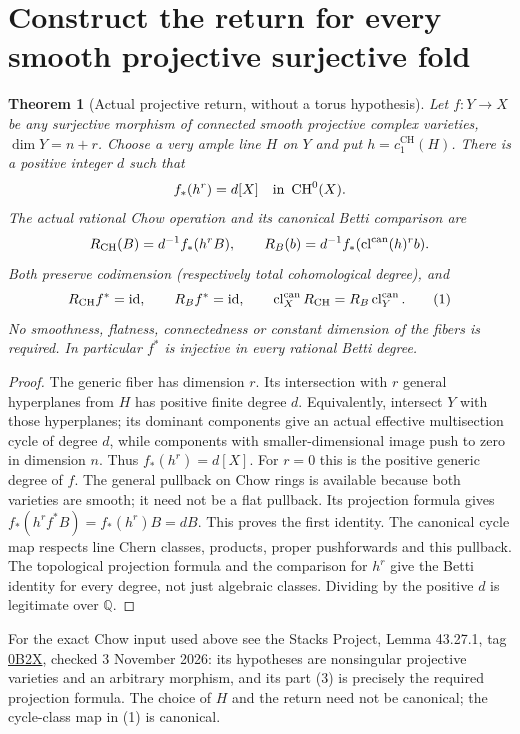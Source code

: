 \documentclass[11pt]{article}
\newtheorem{theorem}{Theorem}
\newcommand{\Q}{\mathbb Q}
\newcommand{\CH}{\operatorname{CH}}
\newcommand{\cl}{\operatorname{cl}^{\rm can}}
\begin{document}
\section{Construct the return for every smooth projective surjective fold}
\begin{theorem}[Actual projective return, without a torus hypothesis]\label{thm:return}
Let $f:Y\to X$ be any surjective morphism of connected smooth projective
complex varieties, $\dim Y=n+r$. Choose a very ample line $H$ on $Y$ and
put $h=c_1^{\CH}(H)$. There is a positive integer $d$ such that
\[
 f_*(h^r)=d[X]\quad\hbox{in }\CH^0(X).
\]
The actual rational Chow operation and its canonical Betti comparison are
\[
 R_{\CH}(B)=d^{-1}f_*(h^r B),\qquad
 R_B(b)=d^{-1}f_*(\cl(h)^r b).
\]
Both preserve codimension (respectively total cohomological degree), and
\[
 R_{\CH}f^*=\mathrm{id},\qquad R_B f^*=\mathrm{id},\qquad
 \cl_X R_{\CH}=R_B\cl_Y.                         \tag{1}
\]
No smoothness, flatness, connectedness or constant dimension of the fibers
is required. In particular $f^*$ is injective in every rational Betti degree.
\end{theorem}
\begin{proof}
The generic fiber has dimension $r$. Its intersection with $r$ general
hyperplanes from $H$ has positive finite degree $d$. Equivalently, intersect
$Y$ with those hyperplanes; its dominant components give an actual effective
multisection cycle of degree $d$, while components with smaller-dimensional
image push to zero in dimension $n$. Thus $f_*(h^r)=d[X]$.
For $r=0$ this is the positive generic degree of $f$.
The general pullback on Chow rings is available because both varieties
are smooth; it need not be a flat pullback. Its projection formula gives
$f_*(h^r f^*B)=f_*(h^r)B=dB$. This proves the first identity.
The canonical cycle map respects line Chern classes, products, proper
pushforwards and this pullback. The topological projection formula and
the comparison for $h^r$ give the Betti identity for every degree, not just
algebraic classes. Dividing by the positive $d$ is legitimate over $\Q$.
\end{proof}
For the exact Chow input used above see the Stacks Project,
Lemma 43.27.1, tag \href{https://stacks.math.columbia.edu/tag/0B2X}{0B2X},
checked 3 November 2026: its hypotheses are nonsingular projective varieties
and an arbitrary morphism, and its part (3) is precisely the required
projection formula. The choice of $H$ and the return need not be canonical;
the cycle-class map in (1) is canonical.
\end{document}
